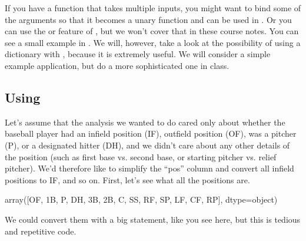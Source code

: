 \documentclass[letterpaper,10pt,english]{sphinxmanual}
\begin{document}
If you have a function that takes multiple inputs, you might want to bind some of the arguments so that it becomes a unary function and can be used in .  Or you can use the  or  feature of , but we won’t cover that in these course notes.  You can see a small example in .  We will, however, take a look at the possibility of using a dictionary with , because it is extremely useful.  We will consider a simple example application, but do a more sophisticated one in class.


\subsection{Using }
\label{\detokenize{chapter-11-processing-rows:using-map}}
Let’s assume that the analysis we wanted to do cared only about whether the baseball player had an infield position (IF), outfield position (OF), was a pitcher (P), or a designated hitter (DH), and we didn’t care about any other details of the position (such as first base vs. second base, or starting pitcher vs. relief pitcher).  We’d therefore like to simplify the “pos” column and convert all infield positions to IF, and so on.  First, let’s see what all the positions are.

\begin{sphinxVerbatim}[commandchars=\\\{\}]
\PYG{p}{[}\PYG{p}{]}
\end{sphinxVerbatim}

\begin{sphinxVerbatim}[commandchars=\\\{\}]
array([\PYGZsq{}OF\PYGZsq{}, \PYGZsq{}1B\PYGZsq{}, \PYGZsq{}P\PYGZsq{}, \PYGZsq{}DH\PYGZsq{}, \PYGZsq{}3B\PYGZsq{}, \PYGZsq{}2B\PYGZsq{}, \PYGZsq{}C\PYGZsq{}, \PYGZsq{}SS\PYGZsq{}, \PYGZsq{}RF\PYGZsq{}, \PYGZsq{}SP\PYGZsq{}, \PYGZsq{}LF\PYGZsq{},
       \PYGZsq{}CF\PYGZsq{}, \PYGZsq{}RP\PYGZsq{}], dtype=object)
\end{sphinxVerbatim}

We could convert them with a big  statement, like you see here, but this is tedious and repetitive code.
\end{document}
